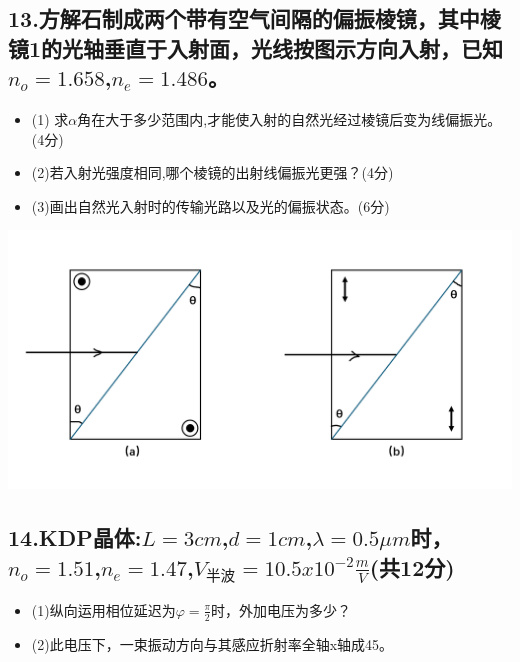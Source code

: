 \documentclass[11pt,a4paper]{article}
\begin{document}
    \subsection*{13.方解石制成两个带有空气间隔的偏振棱镜，其中棱镜1的光轴垂直于入射面，光线按图示方向入射，已知$n_o=1.658$,$n_e=1.486$。}
    \begin{itemize}
        \vspace{-3mm}
        \item (1) 求$\alpha $角在大于多少范围内,才能使入射的自然光经过棱镜后变为线偏振光。(4分)
        \vspace{-3mm}
        \item (2)若入射光强度相同,哪个棱镜的出射线偏振光更强？(4分)
        \vspace{-3mm}
        \item (3)画出自然光入射时的传输光路以及光的偏振状态。(6分)
    \end{itemize}
    \vspace{-3mm}
    \includegraphics[scale=0.2]{7.png}%
    \subsection*{14.KDP晶体:$L=3cm$,$d=1cm$,$\lambda =0.5\mu m$时，$n_o=1.51$,$n_e=1.47$,$V_\text{半波}=10.5x10^{-2} \frac{m}{V}$(共12分)}
    \begin{itemize}
        \vspace{-3mm}
        \item (1)纵向运用相位延迟为$\varphi = \frac{\pi}{2}时，外加电压为多少？$
        \vspace{-3mm}
        \item (2)此电压下，一束振动方向与其感应折射率全轴x轴成45。
    \end{itemize}
    \vspace{-3mm}
\end{document}
